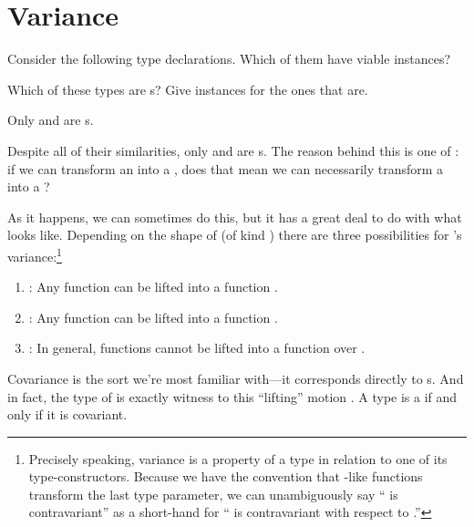 \documentclass[book.tex]{subfiles}
\begin{document}
\chapter{Variance}

Consider the following type declarations. Which of them have viable 
instances?


\begin{exercise}
Which of these types are s? Give instances for the ones that are.
\end{exercise}
\begin{solution}
  Only  and  are s.

\end{solution}

Despite all of their similarities, only  and  are s.
The reason behind this is one of : if we can transform an 
into a , does that mean we can necessarily transform a  into a
?

As it happens, we can sometimes do this, but it has a great deal to do with what
 looks like. Depending on the shape of  (of kind ) there are three possibilities for 's variance:\footnote{Precisely
speaking, variance is a property of a type in relation to one of its
type-constructors. Because we have the convention that -like functions
transform the last type parameter, we can unambiguously say `` is
contravariant'' as a short-hand for `` is contravariant with respect to
.''}

\begin{enumerate}
  \item{: Any function  can be lifted into
    a function .}
  \item{: Any function  can be
    lifted into a function .}
  \item{: In general, functions  cannot
    be lifted into a function over .}
\end{enumerate}

Covariance is the sort we're most familiar with---it corresponds directly to
s. And in fact, the type of  is exactly witness to this
``lifting'' motion . A type  is a 
if and only if it is covariant.
\end{document}
